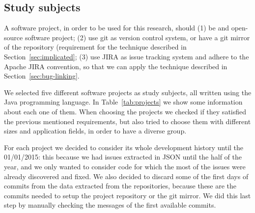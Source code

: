 
\subsection{Study subjects}
\label{sec:subjects}
A software project, in order to be used for this research, should (1) be and open-source software project; (2) use git as version control system, or have a git mirror of the repository (requirement for the technique described in Section~\ref{sec:implicated}; (3) use JIRA as issue tracking system and adhere to the Apache JIRA convention, so that we can apply the technique described in Section~\ref{sec:bug-linking}.

We selected five different software projects as study subjects, all written using the Java programming language. In Table~\ref{tab:projects} we show some information about each one of them. When choosing the projects we checked if they satisfied the previous mentioned requirements, but also tried to choose them with different sizes and application fields, in order to have a diverse group.

For each project we decided to  consider its whole development history until the 01/01/2015: this because we had issues extracted in JSON until the half of the year, and we only wanted to consider code for which the most of the issues were already discovered and fixed. We also decided to discard some of the first days of commits from the data extracted from the repositories, because these are the commits needed to setup the project repository or the git mirror. %
We did this last step by manually checking the messages of the first available commits.

